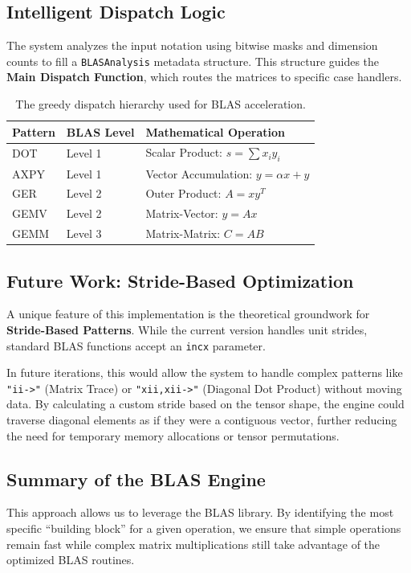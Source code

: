 \documentclass[binding=0.6cm]{sapthesis}
\begin{document}
\subsection{Intelligent Dispatch Logic}

The system analyzes the input notation using bitwise masks and dimension counts to fill a \texttt{BLASAnalysis} metadata structure. This structure guides the \textbf{Main Dispatch Function}, which routes the matrices to specific case handlers.

\begin{table}[h]
	\centering
	\begin{tabular}{|l|l|l|}
		\hline
		\textbf{Pattern} & \textbf{BLAS Level} & \textbf{Mathematical Operation}         \\ \hline
		DOT              & Level 1             & Scalar Product: $s = \sum x_i y_i$      \\ \hline
		AXPY             & Level 1             & Vector Accumulation: $y = \alpha x + y$ \\ \hline
		GER              & Level 2             & Outer Product: $A = x y^T$              \\ \hline
		GEMV             & Level 2             & Matrix-Vector: $y = Ax$                 \\ \hline
		GEMM             & Level 3             & Matrix-Matrix: $C = AB$                 \\ \hline
	\end{tabular}
	\caption{The greedy dispatch hierarchy used for BLAS acceleration.}
\end{table}

\subsection{Future Work: Stride-Based Optimization}

A unique feature of this implementation is the theoretical groundwork for \textbf{Stride-Based Patterns}. While the current version handles unit strides, standard BLAS functions accept an \texttt{incx} parameter.

In future iterations, this would allow the system to handle complex patterns like \texttt{"ii->"} (Matrix Trace) or \texttt{"xii,xii->"} (Diagonal Dot Product) without moving data. By calculating a custom stride based on the tensor shape, the engine could traverse diagonal elements as if they were a contiguous vector, further reducing the need for temporary memory allocations or tensor permutations.

\subsection{Summary of the BLAS Engine}
This approach allows us to leverage the BLAS library. By identifying the most specific ``building block'' for a given operation, we ensure that simple operations remain fast while complex matrix multiplications still take advantage of the optimized BLAS routines.


\end{document}
